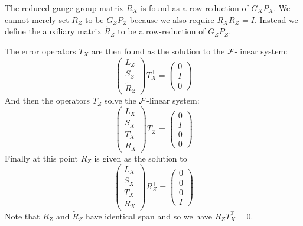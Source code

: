 The reduced gauge group matrix $R_X$
is found as a row-reduction of $G_X P_X.$
We cannot merely set $R_Z$ to be $G_Z P_Z$ 
because we also require $R_X R_Z^\top = I.$
Instead we define the auxiliary matrix
$\widetilde{R}_Z$ to be a row-reduction of  $G_Z P_Z.$

The error operators $T_X$ are then found as the solution
to the $\mathcal{F}$-linear system:
$$
\left( \begin{array}{l}
L_Z\\
S_Z\\
\widetilde{R}_Z
\end{array} \right)
T_X^\top = 
\left( \begin{array}{l}
0\\
I\\
0
\end{array} \right)
$$
And then the operators $T_Z$ solve the $\mathcal{F}$-linear system:
$$
\left( \begin{array}{l}
L_X\\
S_X\\
T_X\\
R_X
\end{array} \right)
T_Z^\top = 
\left( \begin{array}{l}
0\\
I\\
0\\
0
\end{array} \right)
$$
Finally at this point $R_Z$ is given as the solution to
$$
\left( \begin{array}{l}
L_X\\
S_X\\
T_X\\
R_X
\end{array} \right)
R_Z^\top = 
\left( \begin{array}{l}
0\\
0\\
0\\
I
\end{array} \right)
$$
Note that $R_Z$ and $\widetilde{R}_Z$ have identical span 
and so we have $R_Z T_X^\top = 0.$

